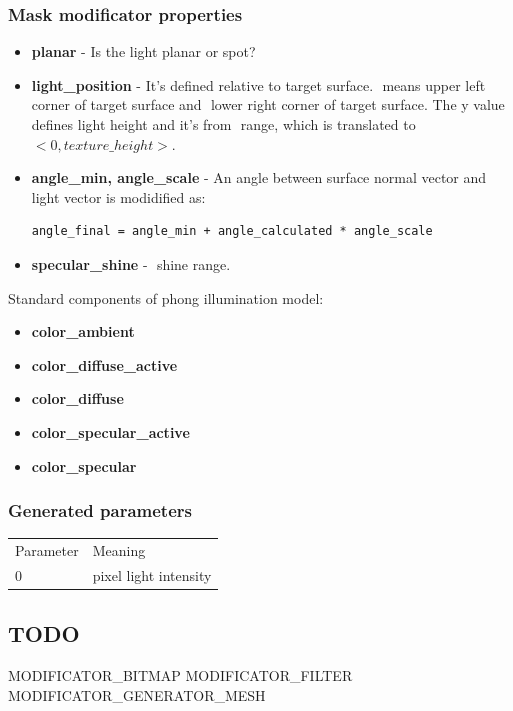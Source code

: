 \documentclass[9pt]{article}
\begin{document}
\subsubsection*{Mask modificator properties}
\begin{itemize}
\item{\bf planar} - Is the light planar or spot?
\item{\bf light\_position} - It's defined relative to target surface. 
\begin{math}<-1,y,-1>\end{math} means upper left corner of target surface and \begin{math}<1,y,1>\end{math} lower right
corner of target surface. The y value defines light height and it's from \begin{math}<0,1>\end{math} range, 
which is translated to \begin{math}<0,texture\_height>\end{math}.
\item{\bf angle\_min, angle\_scale} - An angle between surface normal vector and light vector
is modidified as:
\begin{verbatim}
angle_final = angle_min + angle_calculated * angle_scale
\end{verbatim}
\item{\bf specular\_shine} - \begin{math}<0,1>\end{math} shine range.
\end{itemize}
Standard components of phong illumination model:
\begin{itemize}
\item{\bf color\_ambient}
\item{\bf color\_diffuse\_active}
\item{\bf color\_diffuse}
\item{\bf color\_specular\_active}
\item{\bf color\_specular}
\end{itemize}
\subsubsection*{Generated parameters}
\begin{tabular}{|l||l|}
  Parameter & Meaning \\
  0 & pixel light intensity \\
\end{tabular}

\subsection{TODO}
MODIFICATOR\_BITMAP
MODIFICATOR\_FILTER
MODIFICATOR\_GENERATOR\_MESH
\end{document}
